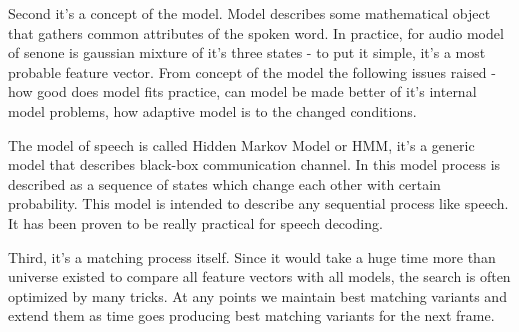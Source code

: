 \documentclass[12pt,a4paper,oldfontcommands]{memoir}
\begin{document}
Second it's a concept of the model. Model describes some mathematical object that gathers common attributes of the spoken word. In practice, for audio model of senone is gaussian mixture of it's three states - to put it simple, it's a most probable feature vector. From concept of the model the following issues raised - how good does model fits practice, can model be made better of it's internal model problems, how adaptive model is to the changed conditions.

The model of speech is called Hidden Markov Model or HMM, it's a generic model that describes black-box communication channel. In this model process is described as a sequence of states which change each other with certain probability. This model is intended to describe any sequential process like speech. It has been proven to be really practical for speech decoding.

Third, it's a matching process itself. Since it would take a huge time more than universe existed to compare all feature vectors with all models, the search is often optimized by many tricks. At any points we maintain best matching variants and extend them as time goes producing best matching variants for the next frame.
\end{document}
